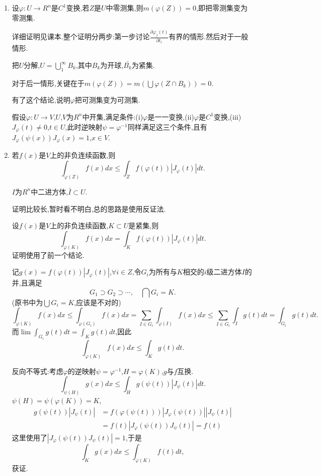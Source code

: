 \documentclass[12pt,a4paper,openany]{book}
\begin{document}
\begin{enumerate}
\item 设$\varphi:U \rightarrow R^n$是$C^1$变换,若$Z$是$U$中零测集,则$m(\varphi(Z))=0$,即把零测集变为零测集.

详细证明见课本.整个证明分两步:第一步讨论$\frac{\partial{\varphi_j(t)}}{\partial{t_i}}$有界的情形.然后对于一般情形.

把$U$分解,$U=\bigcup_{1}^{\infty}{B_k}$,其中$B_k$为开球,$\bar{B_k}$为紧集.

对于后一情形,关键在于$m(\varphi(Z))=m(\bigcup{\varphi(Z \cap B_k)})=0$.

有了这个结论,说明$\varphi$把可测集变为可测集.

假设$\varphi:U \rightarrow V$,$U$,$V$为$R^n$中开集,满足条件:(i)$\varphi$是一一变换,(ii)$\varphi$是$C^1$变换,(iii)$J_{\varphi}(t) \neq 0$,$t \in U$,此时逆映射$\psi=\varphi^{-1}$同样满足这三个条件,且有$J_{\varphi}(\psi(x))J_{\varphi}(x)=1$,$x \in V$.

\item 若$f(x)$是$V$上的非负连续函数,则
\[
\int_{\varphi(Z)}{f(x)dx} \le \int_{Z}{f(\varphi(t))|J_{\varphi}(t)|dt}.
\]

$I$为$R^n$中二进方体,$\bar{I} \subset U$.

证明比较长,暂时看不明白,总的思路是使用反证法.

设$f(x)$是$V$上的非负连续函数,$K \subset U$是紧集,则
\[
\int_{\varphi(K)}{f(x)dx}=\int_{K}{f(\varphi(t))|J_{\varphi}(t)|dt}.
\]
证明使用了前一个结论.

记$g(x)=f(\varphi(t))|J_{\varphi}(t)|$,$\forall i \in Z$,令$G_i$为所有与$K$相交的$i$级二进方体$I$的并,且满足
\[
G_1 \supset G_2 \supset \cdots, \quad \bigcap{G_i}=K.
\]
(原书中为$\bigcup{G_i}=K$,应该是不对的)
\[
\int_{\varphi(K)}{f(x)dx} \le \int_{\varphi(G_i)}{f(x)dx} = \sum_{I \in G_i}{\int_{\varphi(I)}{f(x)dx}} \le \sum_{I \in G_i}{\int_{I}{g(t)dt}} = \int_{G_i}{g(t)dt}.
\]
而$\lim{\int_{G_i}{g(t)dt}} = \int_{K}{g(t)dt}$,因此
\[
\int_{\varphi(K)}{f(x)dx} \le \int_{K}{g(t)dt}.
\]

反向不等式:考虑$\varphi$的逆映射$\psi=\varphi^{-1}$,$H=\varphi(K)$,$g$与$f$互换.
\[
\int_{\psi(H)}{g(x)dx} \le \int_{H}{g(\psi(t))|J_{\psi}(t)|dt}.
\]
$\psi(H)=\psi(\varphi(K))=K$,
\[
\begin{aligned}
g(\psi(t))|J_{\psi}(t)|&=f(\varphi(\psi(t)))|J_{\varphi}(\psi(t))||J_{\psi}(t)|\\
&=f(t)|J_{\varphi}(\psi(t))J_{\psi}(t)| = f(t)
\end{aligned}
\]
这里使用了$|J_{\varphi}(\psi(t))J_{\psi}(t)|=1$,于是
\[
\int_{K}{g(x)dx} \le \int_{\varphi(K)}{f(t)dt},
\]
获证.


\end{enumerate}
\end{document}
